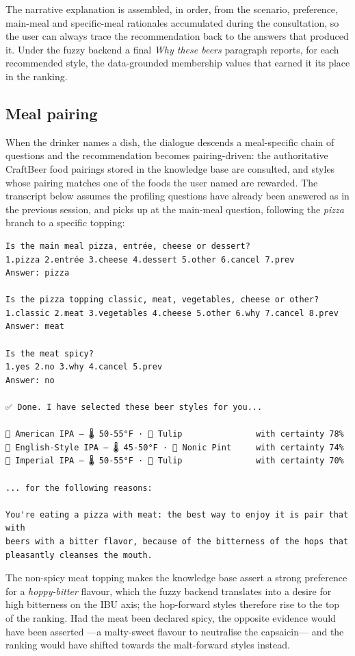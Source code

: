 The narrative explanation is assembled, in order, from the scenario, preference,
main-meal and specific-meal rationales accumulated during the consultation, so
the user can always trace the recommendation back to the answers that produced
it. Under the fuzzy backend a final \emph{Why these beers} paragraph reports, for
each recommended style, the data-grounded membership values that earned it its
place in the ranking.


\subsection{Meal pairing}

When the drinker names a dish, the dialogue descends a meal-specific chain of
questions and the recommendation becomes pairing-driven: the authoritative
CraftBeer food pairings stored in the knowledge base are consulted, and styles
whose pairing matches one of the foods the user named are rewarded. The
transcript below assumes the profiling questions have already been answered as in
the previous session, and picks up at the main-meal question, following the
\emph{pizza} branch to a specific topping:

\begin{lstlisting}[numbers=none]
Is the main meal pizza, entrée, cheese or dessert?
1.pizza 2.entrée 3.cheese 4.dessert 5.other 6.cancel 7.prev
Answer: pizza

Is the pizza topping classic, meat, vegetables, cheese or other?
1.classic 2.meat 3.vegetables 4.cheese 5.other 6.why 7.cancel 8.prev
Answer: meat

Is the meat spicy?
1.yes 2.no 3.why 4.cancel 5.prev
Answer: no

✅ Done. I have selected these beer styles for you...

🍺 American IPA — 🌡 50-55°F · 🥃 Tulip               with certainty 78%
🍺 English-Style IPA — 🌡 45-50°F · 🥃 Nonic Pint     with certainty 74%
🍺 Imperial IPA — 🌡 50-55°F · 🥃 Tulip               with certainty 70%

... for the following reasons:

You're eating a pizza with meat: the best way to enjoy it is pair that with
beers with a bitter flavor, because of the bitterness of the hops that
pleasantly cleanses the mouth.
\end{lstlisting}

The non-spicy meat topping makes the knowledge base assert a strong preference
for a \emph{hoppy-bitter} flavour, which the fuzzy backend translates into a
desire for high bitterness on the IBU axis; the hop-forward styles
therefore rise to the top of the ranking. Had the meat been declared spicy, the
opposite evidence would have been asserted ---a malty-sweet flavour to neutralise
the capsaicin--- and the ranking would have shifted towards the malt-forward
styles instead.


